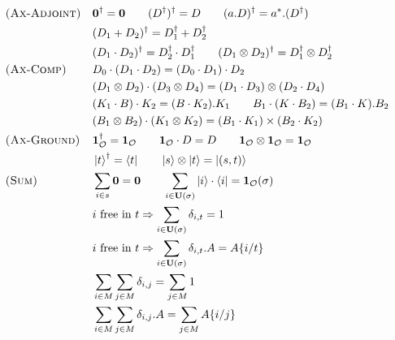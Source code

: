 \begin{align*}
        \\ 
            & \textsc{(Ax-Adjoint)} &&
        \mathbf{0}^\dagger = \mathbf{0}
        \qquad
        (D^\dagger)^\dagger = D 
        \qquad
        (a.D)^\dagger = a^*.(D^\dagger)
        \\ & &&
        (D_1 + D_2)^\dagger = D_1^\dagger + D_2^\dagger
        \\
        & && (D_1 \cdot D_2)^\dagger = D_2^\dagger \cdot D_1^\dagger
        \qquad
        (D_1 \otimes D_2)^\dagger = D_1^\dagger \otimes D_2^\dagger
        \\
            & \textsc{(Ax-Comp)} &&
        D_0 \cdot (D_1 \cdot D_2) = (D_0 \cdot D_1) \cdot D_2
        \\ & &&
        (D_1 \otimes D_2) \cdot (D_3 \otimes D_4) = (D_1 \cdot D_3) \otimes (D_2 \cdot D_4)
        \\ & &&
        (K_1 \cdot B) \cdot K_2 = (B \cdot K_2).K_1
        \qquad
        B_1 \cdot (K \cdot B_2) = (B_1 \cdot K).B_2
        \\ 
            & &&
        (B_1 \otimes B_2) \cdot (K_1 \otimes K_2) = (B_1 \cdot K_1) \times (B_2 \cdot K_2)
        \\ 
            & \textsc{(Ax-Ground)} &&
        \mathbf{1}_\mathcal{O}^\dagger = \mathbf{1}_\mathcal{O}
        \qquad
        \textbf{1}_\mathcal{O} \cdot D = D 
        \qquad
        \mathbf{1}_\mathcal{O} \otimes \mathbf{1}_\mathcal{O} = \mathbf{1}_\mathcal{O} 
        \\ & &&
        \ket{t}^\dagger = \bra{t}
        \qquad
        \ket{s} \otimes \ket{t} =\ket{(s, t)} 
        \\
        & \textsc{(Sum)}
        && \sum_{i \in s} \mathbf{0} = \mathbf{0}
        \qquad 
        \sum_{i \in \mathbf{U}(\sigma)} \ket{i} \cdot \bra{i} = \mathbf{1}_\mathcal{O}(\sigma) \\
        & && i \text{ free in } t \Rightarrow \sum_{i \in \mathbf{U}(\sigma)} \delta_{i, t} = 1 \\
        & && i \text{ free in } t \Rightarrow \sum_{i \in \mathbf{U}(\sigma)} \delta_{i, t}.A = A\{i/t\} \\
        & && \sum_{i \in M} \sum_{j \in M} \delta_{i, j} = \sum_{j \in M} 1 \\
        & && \sum_{i \in M} \sum_{j \in M} \delta_{i, j}.A = \sum_{j \in M} A\{i/j\}
    \end{align*}
